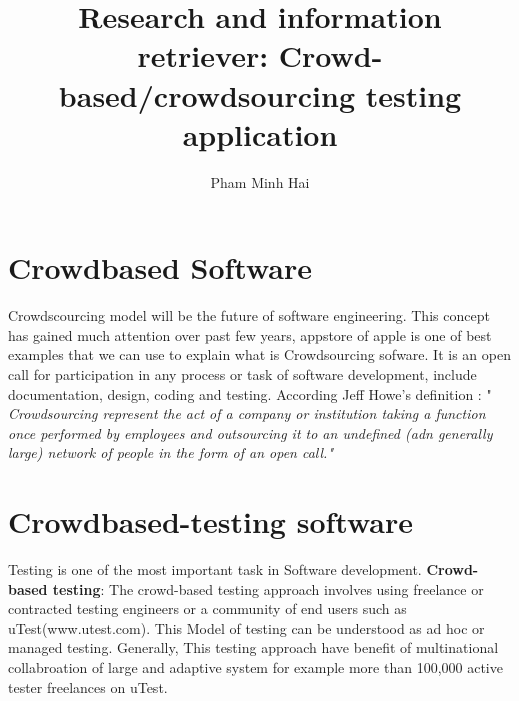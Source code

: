 \documentclass[a4paper,10pt]{article}
\title{Research and information retriever: Crowd-based/crowdsourcing testing application}
\author{Pham Minh Hai}
\begin{document}
\maketitle
\tableofcontents

\section{Crowdbased Software}
 Crowdscourcing model  will be the future of software engineering. This concept has gained much attention over past few years, appstore of apple is one of best examples that we can use to explain what is Crowdsourcing sofware. 
 It is an open call for participation in any process or task of software development, include documentation, design, coding and testing. According Jeff Howe's definition : "\textit{ Crowdsourcing represent the act of a company or institution taking a function once performed by employees and outsourcing it to an undefined (adn generally large) network of people in the form of an open call."} \cite{crowdsourcing}
 
\section{Crowdbased-testing software}

Testing is one of the most important task in Software development. 
\textbf{Crowd-based testing}:\cite{Mobiletest} 
The crowd-based testing approach involves using freelance or contracted testing engineers or a community of end users such as uTest(www.utest.com). This Model of testing can be understood as ad hoc or managed testing. Generally, This testing approach have benefit of multinational collabroation of large and adaptive system for example more than 100,000 active tester freelances on uTest.




\medskip



\end{document}
